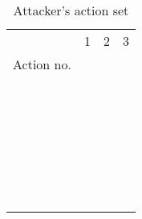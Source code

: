 \documentclass{acm_proc_article-sp}
\begin{document}
\newcommand{\Rownb}{\stepcounter{Rownumberb}\theRownumberb}
\begin{table}[htbp]
\scriptsize
\centering
\begin{tabular}{cccc}\hline
  &  1      &  2       & 3         \\
Action no.             &         &          &           \\\hline
\Rownb                 &   &       &   \\
\Rownb                 &   &       &   \\
                       &   &  &  \\
\Rownb                 &   &       &   \\
                       &    &  &  \\
\Rownb                 &   &       &   \\
                       &    &  &  \\
\Rownb                 &   &       &   \\
                       &    &   &  \\
\Rownb                 &   &       &   \\
                       &   &  &  \\
\Rownb                 &   &    &     \\
\Rownb                &   &   &   \\
                       &  & & \\
\Rownb                 &   &    &     \\
\Rownb                 &   &    &     \\
\Rownb                 &   &    &     \\
\Rownb                 &   &    &     \\
\Rownb                 &   &    &     \\
                       &  &  &  \\
\Rownb                 &   &    &     \\
                       &  &  &  \\
\Rownb                 &   &    &     \\
                       &  &  &  \\
\Rownb                 &   &    &     \\
                       &  &  &  \\
\Rownb                 &   &    &     \\
\Rownb                 &   &    &     \\
\hline
\end{tabular}
\caption{\label{attckeraction} Attacker's action set}
\end{table}
\end{document}
